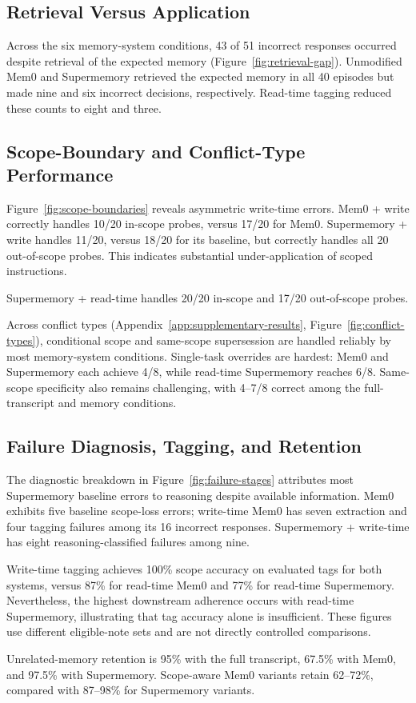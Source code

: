 \subsection{Retrieval Versus Application}

Across the six memory-system conditions, 43 of 51
incorrect responses occurred despite retrieval of
the expected memory (Figure~\ref{fig:retrieval-gap}).
Unmodified Mem0 and Supermemory retrieved the
expected memory in all 40 episodes but made nine
and six incorrect decisions, respectively.
Read-time tagging reduced these counts to eight
and three.



\subsection{Scope-Boundary and Conflict-Type Performance}

Figure~\ref{fig:scope-boundaries} reveals asymmetric
write-time errors. Mem0 + write correctly handles
10/20 in-scope probes, versus 17/20 for Mem0.
Supermemory + write handles 11/20, versus 18/20
for its baseline, but correctly handles all 20
out-of-scope probes. This indicates substantial
under-application of scoped instructions.

Supermemory + read-time handles 20/20 in-scope
and 17/20 out-of-scope probes.



Across conflict types (Appendix~\ref{app:supplementary-results}, Figure~\ref{fig:conflict-types}),
conditional scope and same-scope supersession are
handled reliably by most memory-system conditions.
Single-task overrides are hardest: Mem0 and
Supermemory each achieve 4/8, while read-time
Supermemory reaches 6/8. Same-scope specificity
also remains challenging, with 4--7/8 correct
among the full-transcript and memory conditions.


\subsection{Failure Diagnosis, Tagging, and Retention}

The diagnostic breakdown in
Figure~\ref{fig:failure-stages} attributes most
Supermemory baseline errors to reasoning despite
available information. Mem0 exhibits five baseline
scope-loss errors; write-time Mem0 has seven
extraction and four tagging failures among its
16 incorrect responses. Supermemory + write-time
has eight reasoning-classified failures among nine.



Write-time tagging achieves 100\% scope accuracy
on evaluated tags for both systems, versus 87\%
for read-time Mem0 and 77\% for read-time
Supermemory. Nevertheless, the highest downstream
adherence occurs with read-time Supermemory,
illustrating that tag accuracy alone is insufficient.
These figures use different eligible-note sets
and are not directly controlled comparisons.

Unrelated-memory retention is 95\% with the full
transcript, 67.5\% with Mem0, and 97.5\% with
Supermemory. Scope-aware Mem0 variants retain
62--72\%, compared with 87--98\% for
Supermemory variants.

